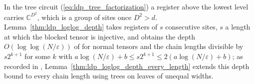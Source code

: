 \begin{remark}
    \label{rem:ldp_tree_measurements_mps}
    In the tree circuit (\ref{eq:ldp_tree_factorization}) a register above
    the lowest level carries $\mathbb C^{D^2}$, which is a group of sites once
    $D^2>d$. Lemma~\ref{thm:ldp_loglog_depth} takes registers of $s$
    consecutive sites, $s$ a length at which the blocked tensor is injective,
    and obtains the depth $O(\log\log(N/\varepsilon))$ of
    \cite{Malz2024Preparation} for normal tensors and the chain lengths
    divisible by $s2^{k+1}$ for some $k$ with
    $a\log(N/\varepsilon)+b\le s2^{k+1}\le2(a\log(N/\varepsilon)+b)$; as recorded in
    \cite{gap:mswc24_tree_measurement_scope},
    Lemma~\ref{thm:ldp_loglog_depth_every_length} extends this depth bound to every chain
    length using trees on leaves of unequal widths.
\end{remark}
